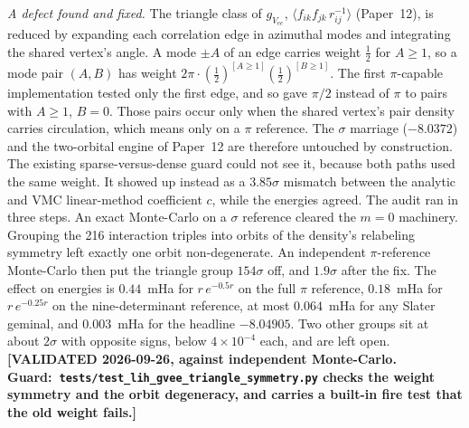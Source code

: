 \documentclass[aps,pra,twocolumn,superscriptaddress,longbibliography]{revtex4-2}
\begin{document}
\emph{A defect found and fixed.}  The triangle class of $g_{V_{ee}}$,
$\langle f_{ik}f_{jk}\,r_{ij}^{-1}\rangle$ (Paper~12), is reduced by expanding
each correlation edge in azimuthal modes and integrating the shared vertex's
angle.  A mode $\pm A$ of an edge carries weight $\tfrac12$ for $A\ge1$, so a
mode pair $(A,B)$ has weight $2\pi\cdot(\tfrac12)^{[A\ge1]}(\tfrac12)^{[B\ge1]}$.
The first $\pi$-capable implementation tested only the first edge, and so gave
$\pi/2$ instead of $\pi$ to pairs with $A\ge1$, $B=0$.  Those pairs occur only
when the shared vertex's pair density carries circulation, which means only on a
$\pi$ reference.  The $\sigma$ marriage ($-8.0372$) and the two-orbital engine of
Paper~12 are therefore untouched by construction.  The existing sparse-versus-dense
guard could not see it, because both paths used the same weight.  It showed up
instead as a $3.85\sigma$ mismatch between the analytic and VMC linear-method
coefficient $c$, while the energies agreed.  The audit ran in three steps.  An
exact Monte-Carlo on a $\sigma$ reference cleared the $m=0$ machinery.  Grouping
the 216 interaction triples into orbits of the density's relabeling symmetry
left exactly one orbit non-degenerate.  An independent $\pi$-reference
Monte-Carlo then put the triangle group $154\sigma$ off, and $1.9\sigma$ after
the fix.  The effect on energies is $0.44$~mHa for $r\,e^{-0.5r}$ on the full
$\pi$ reference, $0.18$~mHa for $r\,e^{-0.25r}$ on the nine-determinant reference,
at most $0.064$~mHa for any Slater geminal, and $0.003$~mHa for the headline
$-8.04905$.  Two other groups sit at
about $2\sigma$ with opposite signs, below $4\times10^{-4}$ each, and are left
open.  \textbf{[VALIDATED 2026-09-26, against independent Monte-Carlo.  Guard:\
\texttt{tests/test\_lih\_gvee\_triangle\_symmetry.py} checks the weight symmetry
and the orbit degeneracy, and carries a built-in fire test that the old weight
fails.]}
\end{document}
